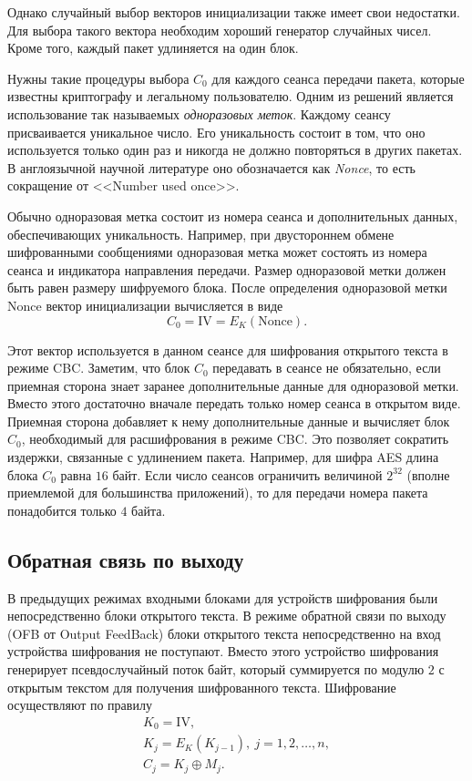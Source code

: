Однако случайный выбор векторов инициализации также имеет свои недостатки. Для выбора такого вектора необходим хороший генератор случайных чисел. Кроме того, каждый пакет удлиняется на один блок.

Нужны такие процедуры выбора $C_0$ для каждого сеанса передачи пакета, которые известны криптографу и легальному пользователю. Одним из решений является использование так называемых \emph{одноразовых меток}. Каждому сеансу присваивается уникальное число. Его уникальность состоит в том, что оно используется только один раз и никогда не должно повторяться в других пакетах. В англоязычной научной литературе оно обозначается как \emph{Nonce}, то есть сокращение от <<Number used once>>.

Обычно одноразовая метка состоит из номера сеанса и дополнительных данных, обеспечивающих уникальность. Например, при двустороннем обмене шифрованными сообщениями одноразовая метка может состоять из номера сеанса и индикатора направления передачи. Размер одноразовой метки должен быть равен размеру шифруемого блока. После определения одноразовой метки $\textrm{Nonce}$ вектор инициализации вычисляется в виде
    \[ C_0 = \textrm{IV} = E_K(\textrm{Nonce}). \]

Этот вектор используется в данном сеансе для шифрования открытого текста в режиме CBC. Заметим, что блок $C_0$ передавать в сеансе не обязательно, если приемная сторона знает заранее дополнительные данные для одноразовой метки. Вместо этого достаточно вначале передать только номер сеанса в открытом виде. Приемная сторона добавляет к нему дополнительные данные и вычисляет блок $C_0$, необходимый для расшифрования в режиме CBC. Это позволяет сократить издержки, связанные с удлинением пакета. Например, для шифра AES длина блока $C_0$ равна $16$ байт. Если число сеансов ограничить величиной $2^{32}$ (вполне приемлемой для большинства приложений), то для передачи номера пакета понадобится только $4$ байта.


\subsection{Обратная связь по выходу}

В предыдущих режимах входными блоками для устройств шифрования были непосредственно блоки открытого текста.
В режиме обратной связи по выходу (OFB от Output FeedBack) блоки открытого текста непосредственно на вход устройства шифрования не поступают. Вместо этого устройство шифрования генерирует псевдослучайный поток байт, который суммируется по модулю $2$ с открытым текстом для получения шифрованного текста. Шифрование осуществляют по правилу
\[ \begin{array}{l}
    K_0 = \textrm{IV}, \\
    K_j = E_K(K_{j-1}), ~ j = 1, 2, \dots, n, \\
    C_j = K_j \oplus M_j.
\end{array} \]

